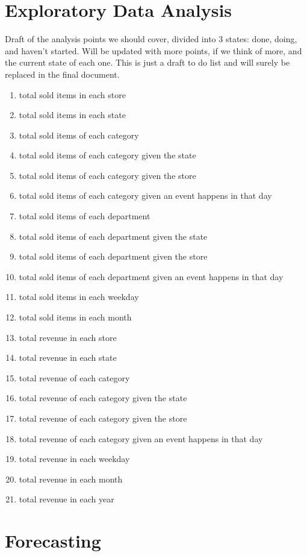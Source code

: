 \documentclass[11pt]{article}
\begin{document}
\section{Exploratory Data Analysis}
Draft of the analysis points we should cover, divided into 3 states: done, doing, and haven't started. Will be updated with more points, if we think of more, and the current state of each one. This is just a draft to do list and will surely be replaced in the final document.
\begin{enumerate}
    \item total sold items in each store
    \item total sold items in each state
    \item total sold items of each category
    \item total sold items of each category given the state
    \item total sold items of each category given the store
    \item total sold items of each category given an event happens in that day
    \item total sold items of each department
    \item total sold items of each department given the state
    \item total sold items of each department given the store
    \item total sold items of each department given an event happens in that day
    \item total sold items in each weekday
    \item total sold items in each month
    \item total revenue in each store
    \item total revenue in each state
    \item total revenue of each category
    \item total revenue of each category given the state
    \item total revenue of each category given the store
    \item total revenue of each category given an event happens in that day
    \item total revenue in each weekday
    \item total revenue in each month
    \item total revenue in each year
\end{enumerate}
\clearpage
\section{Forecasting}
\end{document}
